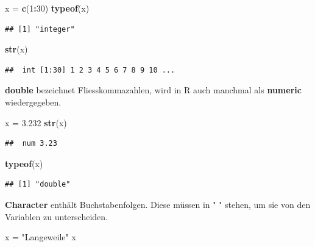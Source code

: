 \documentclass[]{book}
\newenvironment{Shaded}{\begin{snugshade}}{\end{snugshade}}
\newcommand{\KeywordTok}[1]{\textcolor[rgb]{0.13,0.29,0.53}{\textbf{#1}}}
\newcommand{\DecValTok}[1]{\textcolor[rgb]{0.00,0.00,0.81}{#1}}
\newcommand{\FloatTok}[1]{\textcolor[rgb]{0.00,0.00,0.81}{#1}}
\newcommand{\StringTok}[1]{\textcolor[rgb]{0.31,0.60,0.02}{#1}}
\newcommand{\OperatorTok}[1]{\textcolor[rgb]{0.81,0.36,0.00}{\textbf{#1}}}
\newcommand{\NormalTok}[1]{#1}
\begin{document}
\begin{Shaded}
\begin{Highlighting}[]
\NormalTok{x =}\StringTok{ }\KeywordTok{c}\NormalTok{(}\DecValTok{1}\OperatorTok{:}\DecValTok{30}\NormalTok{)}
\KeywordTok{typeof}\NormalTok{(x)}
\end{Highlighting}
\end{Shaded}

\begin{verbatim}
## [1] "integer"
\end{verbatim}

\begin{Shaded}
\begin{Highlighting}[]
\KeywordTok{str}\NormalTok{(x)}
\end{Highlighting}
\end{Shaded}

\begin{verbatim}
##  int [1:30] 1 2 3 4 5 6 7 8 9 10 ...
\end{verbatim}

\textbf{double} bezeichnet Fliesskommazahlen, wird in R auch manchmal
als \textbf{numeric} wiedergegeben.

\begin{Shaded}
\begin{Highlighting}[]
\NormalTok{x =}\StringTok{ }\FloatTok{3.232}
\KeywordTok{str}\NormalTok{(x)}
\end{Highlighting}
\end{Shaded}

\begin{verbatim}
##  num 3.23
\end{verbatim}

\begin{Shaded}
\begin{Highlighting}[]
\KeywordTok{typeof}\NormalTok{(x)}
\end{Highlighting}
\end{Shaded}

\begin{verbatim}
## [1] "double"
\end{verbatim}

\textbf{Character} enthält Buchstabenfolgen. Diese müssen in " " stehen,
um sie von den Variablen zu unterscheiden.

\begin{Shaded}
\begin{Highlighting}[]
\NormalTok{x =}\StringTok{ "Langeweile"}
\NormalTok{x}
\end{Highlighting}
\end{Shaded}
\end{document}
